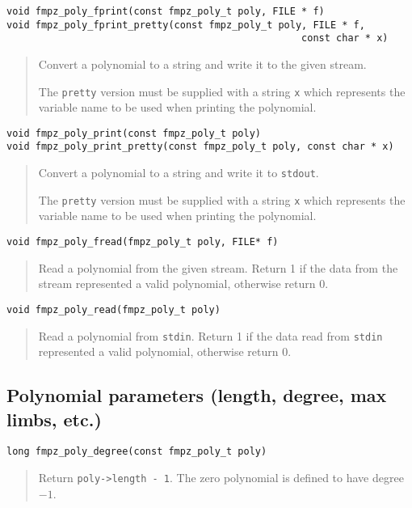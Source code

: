 \documentclass[a4paper,10pt]{article}
\newcommand{\code}{\lstinline}
\begin{document}
\begin{lstlisting}
void fmpz_poly_fprint(const fmpz_poly_t poly, FILE * f)
void fmpz_poly_fprint_pretty(const fmpz_poly_t poly, FILE * f, 
                                                   const char * x)
\end{lstlisting}
\begin{quote}
Convert a polynomial to a string and write it to the given stream. 

The \code{pretty} version must be supplied with a string \code{x} which represents the variable name to be used when printing the polynomial.
\end{quote}

\begin{lstlisting}
void fmpz_poly_print(const fmpz_poly_t poly)
void fmpz_poly_print_pretty(const fmpz_poly_t poly, const char * x)
\end{lstlisting}
\begin{quote}
Convert a polynomial to a string and write it to \code{stdout}. 

The \code{pretty} version must be supplied with a string \code{x} which represents the variable name to be used when printing the polynomial.
\end{quote}

\begin{lstlisting}
void fmpz_poly_fread(fmpz_poly_t poly, FILE* f)
\end{lstlisting}
\begin{quote}
Read a polynomial from the given stream. Return 1 if the data from the stream represented a valid polynomial, otherwise return 0.
\end{quote}

\begin{lstlisting}
void fmpz_poly_read(fmpz_poly_t poly)
\end{lstlisting}
\begin{quote}
Read a polynomial from \code{stdin}. Return 1 if the data read from \code{stdin} represented a valid polynomial, otherwise return 0.
\end{quote}

\subsection{Polynomial parameters (length, degree, max limbs, etc.)}

\begin{lstlisting}
long fmpz_poly_degree(const fmpz_poly_t poly)
\end{lstlisting}
\begin{quote}
Return \code{poly->length - 1}. The zero polynomial is defined to have degree $-1$.
\end{quote}
\end{document}
